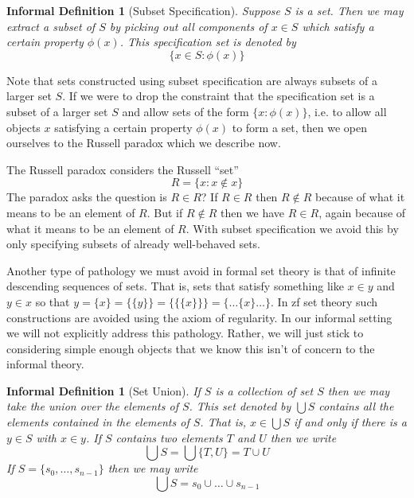 \documentclass[12pt]{article}
\theoremstyle{break}
\theoremstyle{break}
\theoremstyle{break}
\theoremstyle{break}
\theoremstyle{break}
\newtheorem{informal definition}[definition]{Informal Definition}
\theoremstyle{break}
\newtheorem{informal theorem}[theorem]{Informal Theorem}
\newcommand{\qq}[1]{``#1''}
\begin{document}
\begin{informal definition}[Subset Specification]
Suppose $S$ is a set.
Then we may extract a subset of $S$ by picking out all components of $x\in S$ which satisfy a certain property $\phi(x)$.
This specification set is denoted by
\begin{equation*}
\{x\in S: \phi(x)\}
\end{equation*}
\end{informal definition}

Note that sets constructed using subset specification are always subsets of a larger set $S$.
If we were to drop the constraint that the specification set is a subset of a larger set $S$ and allow sets of the form $\{x: \phi(x)\}$, i.e. to allow all objects $x$ satisfying a certain property $\phi(x)$ to form a set, then we open ourselves to the Russell paradox which we describe now.

The Russell paradox considers the Russell \qq{set}
\begin{equation*}
R = \{x: x\not \in x\}
\end{equation*}
The paradox asks the question is $R\in R$?
If $R\in R$ then $R\not \in R$ because of what it means to be an element of $R$.
But if $R\not \in R$ then we have $R\in R$, again because of what it means to be an element of $R$.
With subset specification we avoid this by only specifying subsets of already well-behaved sets.

Another type of pathology we must avoid in formal set theory is that of infinite descending sequences of sets.
That is, sets that satisfy something like $x\in y$ and $y\in x$ so that $y = \{x\} = \{\{y\}\} = \{\{\{x\}\}\} = \{\ldots \{x\} \ldots \}$.
In \gls{zf} set theory such constructions are avoided using the axiom of regularity.
In our informal setting we will not explicitly address this pathology.
Rather, we will just stick to considering simple enough objects that we know this isn't of concern to the informal theory.

\begin{informal definition}[Set Union]
If $S$ is a collection of set $S$ then we may take the union over the elements of $S$.
This set denoted by $\bigcup S$ contains all the elements contained in the elements of $S$.
That is, $x \in \bigcup S$ if and only if there is a $y\in S$ with $x\in y$.
If $S$ contains two elements $T$ and $U$ then we write
$$
\bigcup S = \bigcup \{T, U\} = T \cup U
$$
If $S = \{s_0, \ldots, s_{n-1}\}$ then we may write
$$
\bigcup S = s_0 \cup \ldots \cup s_{n-1}
$$
\end{informal definition}
\end{document}
